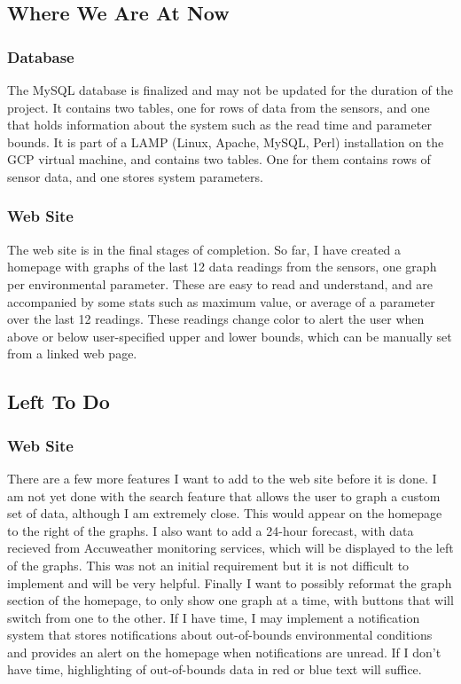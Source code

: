 \documentclass[IEEEtran,letterpaper,10pt,titlepage,fleqn,draftclsnofoot,onecolumn]{article}
\begin{document}
\subsection{Where We Are At Now}

\subsubsection{Database}

The MySQL database is finalized and may not be updated for the duration of the project. It contains two tables, one for rows of data from the sensors, and one that holds information about the system such as the read time and parameter bounds. It is part of a LAMP (Linux, Apache, MySQL, Perl) installation on the GCP virtual machine, and contains two tables. One for them contains rows of sensor data, and one stores system parameters. 

\subsubsection{Web Site}

The web site is in the final stages of completion. So far, I have created a homepage with graphs of the last 12 data readings from the sensors, one graph per environmental parameter. These are easy to read and understand, and are accompanied by some stats such as maximum value, or average of a parameter over the last 12 readings. These readings change color to alert the user when above or below user-specified upper and lower bounds, which can be manually set from a linked web page.

\subsection{Left To Do}

\subsubsection{Web Site}There are a few more features I want to add to the web site before it is done. I am not yet done with the search feature that allows the user to graph a custom set of data, although I am extremely close. This would appear on the homepage to the right of the graphs. I also want to add a 24-hour forecast, with data recieved from Accuweather monitoring services, which will be displayed to the left of the graphs. This was not an initial requirement but it is not difficult to implement and will be very helpful. Finally I want to possibly reformat the graph section of the homepage, to only show one graph at a time, with buttons that will switch from one to the other. If I have time, I may implement a notification system that stores notifications about out-of-bounds environmental conditions and provides an alert on the homepage when notifications are unread. If I don't have time, highlighting of out-of-bounds data in red or blue text will suffice.  
\end{document}

